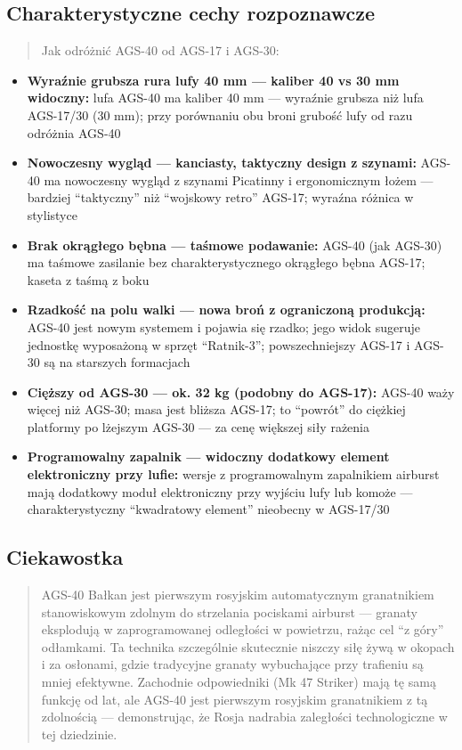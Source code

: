 \documentclass[12pt,oneside]{book}
\providecommand{\tightlist}{%
  \setlength{\itemsep}{0pt}\setlength{\parskip}{0pt}}
\begin{document}
\subsection{Charakterystyczne cechy
rozpoznawcze}\label{charakterystyczne-cechy-rozpoznawcze-99}

\begin{quote}
Jak odróżnić AGS-40 od AGS-17 i AGS-30:
\end{quote}

\begin{itemize}
\tightlist
\item
  \textbf{Wyraźnie grubsza rura lufy 40 mm --- kaliber 40 vs 30 mm
  widoczny:} lufa AGS-40 ma kaliber 40 mm --- wyraźnie grubsza niż lufa
  AGS-17/30 (30 mm); przy porównaniu obu broni grubość lufy od razu
  odróżnia AGS-40
\item
  \textbf{Nowoczesny wygląd --- kanciasty, taktyczny design z szynami:}
  AGS-40 ma nowoczesny wygląd z szynami Picatinny i ergonomicznym łożem
  --- bardziej ``taktyczny'' niż ``wojskowy retro'' AGS-17; wyraźna
  różnica w stylistyce
\item
  \textbf{Brak okrągłego bębna --- taśmowe podawanie:} AGS-40 (jak
  AGS-30) ma taśmowe zasilanie bez charakterystycznego okrągłego bębna
  AGS-17; kaseta z taśmą z boku
\item
  \textbf{Rzadkość na polu walki --- nowa broń z ograniczoną produkcją:}
  AGS-40 jest nowym systemem i pojawia się rzadko; jego widok sugeruje
  jednostkę wyposażoną w sprzęt ``Ratnik-3''; powszechniejszy AGS-17 i
  AGS-30 są na starszych formacjach
\item
  \textbf{Cięższy od AGS-30 --- ok. 32 kg (podobny do AGS-17):} AGS-40
  waży więcej niż AGS-30; masa jest bliższa AGS-17; to ``powrót'' do
  ciężkiej platformy po lżejszym AGS-30 --- za cenę większej siły
  rażenia
\item
  \textbf{Programowalny zapalnik --- widoczny dodatkowy element
  elektroniczny przy lufie:} wersje z programowalnym zapalnikiem
  airburst mają dodatkowy moduł elektroniczny przy wyjściu lufy lub
  komoże --- charakterystyczny ``kwadratowy element'' nieobecny w
  AGS-17/30
\end{itemize}

\subsection{Ciekawostka}\label{ciekawostka-99}

\begin{quote}
AGS-40 Bałkan jest pierwszym rosyjskim automatycznym granatnikiem
stanowiskowym zdolnym do strzelania pociskami airburst --- granaty
eksplodują w zaprogramowanej odległości w powietrzu, rażąc cel ``z
góry'' odłamkami. Ta technika szczególnie skutecznie niszczy siłę żywą w
okopach i za osłonami, gdzie tradycyjne granaty wybuchające przy
trafieniu są mniej efektywne. Zachodnie odpowiedniki (Mk 47 Striker)
mają tę samą funkcję od lat, ale AGS-40 jest pierwszym rosyjskim
granatnikiem z tą zdolnością --- demonstrując, że Rosja nadrabia
zaległości technologiczne w tej dziedzinie.
\end{quote}
\end{document}

